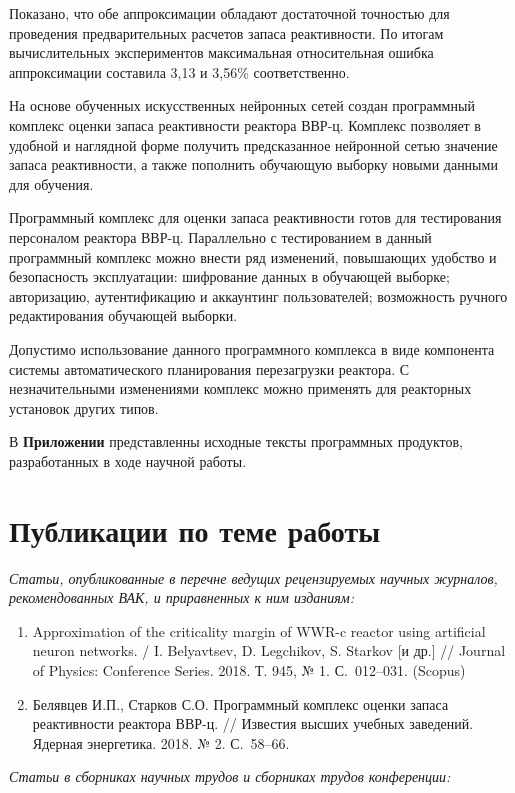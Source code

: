 Показано, что обе аппроксимации обладают достаточной точностью для проведения предварительных расчетов запаса реактивности.
По итогам вычислительных экспериментов максимальная относительная ошибка аппроксимации составила 3,13 и 3,56\% соответственно.

На основе обученных искусственных нейронных сетей создан программный комплекс оценки запаса реактивности реактора ВВР-ц.
Комплекс позволяет в удобной и наглядной форме получить предсказанное нейронной сетью значение запаса реактивности, а также пополнить обучающую выборку новыми данными для обучения.

Программный комплекс для оценки запаса реактивности готов для тестирования персоналом реактора ВВР-ц.
Параллельно с тестированием в данный программный комплекс можно внести ряд изменений, повышающих удобство и безопасность эксплуатации: шифрование данных в обучающей выборке; авторизацию, аутентификацию и аккаунтинг пользователей; возможность ручного редактирования обучающей выборки.

Допустимо использование данного программного комплекса в виде компонента системы автоматического планирования перезагрузки реактора. 
С незначительными изменениями комплекс можно применять для реакторных установок других типов.

В \textbf{Приложении} представленны исходные тексты программных продуктов, разработанных в ходе научной работы.


\section*{Публикации по теме работы}

{\it Статьи, опубликованные в перечне ведущих рецензируемых научных журналов, рекомендованных ВАК, и приравненных к ним изданиям:}

\begin{enumerate}
    \item Approximation of the criticality margin of WWR-c reactor using artificial neuron networks. / I. Belyavtsev, D. Legchikov, S. Starkov [и др.] // Journal of Physics: Conference Series. 2018. Т. 945, № 1. С.~012–031. (Scopus)\cite{iop-2018}
    \item Белявцев И.П., Старков С.О. Программный комплекс оценки запаса реактивности реактора ВВР-ц. // Известия высших учебных заведений. Ядерная энергетика. 2018. № 2. С.~58–66. \cite{npe-2018}
\end{enumerate}

{\it Статьи в сборниках научных трудов и сборниках трудов конференции:}


